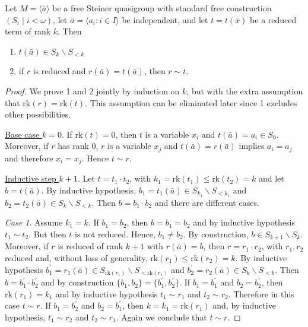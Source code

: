 \documentclass[10pt,a4paper]{amsart}
\newcommand{\rk}{\mathrm{rk}}
\begin{document}
	\begin{prop}\label{May19_1}
		Let $M=\langle \bar{a}\rangle$ be a free Steiner quasigroup with standard free construction $(S_i\mid i<\omega)$, let  $\bar{a}= \langle a_i : i \in I \rangle$ be  independent, and let $t= t(\bar{x})$ be a reduced term of rank $k$. Then
		\begin{enumerate}
			\item $t(\bar{a})\in S_k\smallsetminus S_{<k}$
			\item if $r$ is reduced and  $r(\bar{a})= t(\bar{a})$, then $r\sim t$.
		\end{enumerate}
	\end{prop}

	\begin{proof} We prove 1 and 2 jointly by induction on $k$, but with the extra assumption that $\rk(r)=\rk(t)$. This assumption can be eliminated  later since 1 excludes other possibilities.
		
		\underline{Base case $k=0$}.  If $\rk(t)=0$, then $t$ is a variable $x_i$ and  $t(\bar{a})= a_i\in S_0$.  Moreover, if $r$ has rank 0, $r$ is a variable $x_j$  and  $t(\bar{a})= r(\bar{a})$  implies $a_i =a_j$ and therefore  $x_i = x_j$. Hence  $t\sim r$.
		
		\underline{Inductive step $k+1$}.  Let $t= t_1\cdot t_2$, with $k_1= \rk(t_1)\leq \rk(t_2) = k$ and let  $b= t(\bar{a})$.  By inductive hypothesis, $b_1= t_1(\bar{a})\in S_{k_1}\smallsetminus S_{<k_1}$ and $b_2= t_2(\bar{a})\in S_k\smallsetminus S_{<k}$. Then $b= b_1\cdot b_2$ and there are different cases.
		
		\emph{Case 1}. Assume $k_1 = k$.  If  $b_1 = b_2$, then $b= b_1= b_2$ and by inductive hypothesis $t_1\sim t_2$. But then $t$ is not reduced. Hence, 
		$b_1\neq b_2$. By construction, $b\in S_{k+1}\smallsetminus S_k$.  Moreover, if $r$ is reduced of rank $k+1$ with $r(\bar{a})= b$, then $r= r_1\cdot r_2$, with $r_1,r_2$ reduced and, without loss of generality, $\rk(r_1)\leq \rk(r_2)= k$. By inductive hypothesis $b_1^\prime = r_1(\bar{a})\in S_{\rk(r_1)}\smallsetminus S_{<\rk(r_1)}$  and $b_2^\prime = r_2(\bar{a})\in S_k\smallsetminus S_{<k}$. Then $b= b_1^\prime\cdot b_2^\prime$ and by construction $\{b_1,b_2\}= \{b_1^\prime,b_2^\prime\}$. If $b_1= b_1^\prime$ and $b_2 = b_2^\prime$, then $\rk(r_1)= k_1$ and by inductive hypothesis $t_1\sim r_1$ and $t_2\sim r_2$. Therefore in this case $t\sim r$. If $b_1= b_2^\prime$ and $b_2= b_1^\prime$, then $k=k_1= \rk(r_1)$ and, by inductive hypothesis, $t_1\sim r_2$ and $t_2\sim r_1$. Again we conclude that $t\sim r$.
		

\end{proof}
\end{document}
